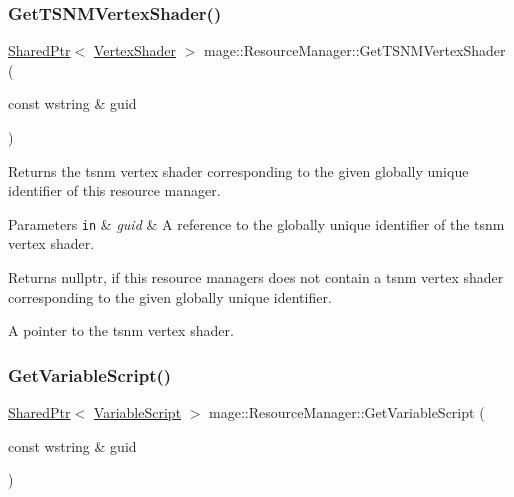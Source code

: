 \subsubsection{\texorpdfstring{Get\+T\+S\+N\+M\+Vertex\+Shader()}{GetTSNMVertexShader()}}
{\footnotesize\ttfamily \hyperlink{namespacemage_a1e01ae66713838a7a67d30e44c67703e}{Shared\+Ptr}$<$ \hyperlink{classmage_1_1_vertex_shader}{Vertex\+Shader} $>$ mage\+::\+Resource\+Manager\+::\+Get\+T\+S\+N\+M\+Vertex\+Shader (\begin{DoxyParamCaption}\item[{const wstring \&}]{guid }\end{DoxyParamCaption})\hspace{0.3cm}{\ttfamily [noexcept]}}

Returns the tsnm vertex shader corresponding to the given globally unique identifier of this resource manager.


\begin{DoxyParams}[1]{Parameters}
\mbox{\tt in}  & {\em guid} & A reference to the globally unique identifier of the tsnm vertex shader. \\
\hline
\end{DoxyParams}
\begin{DoxyReturn}{Returns}
{\ttfamily nullptr}, if this resource managers does not contain a tsnm vertex shader corresponding to the given globally unique identifier. 

A pointer to the tsnm vertex shader. 
\end{DoxyReturn}
\hypertarget{classmage_1_1_resource_manager_ac54eb6fd61322a66bdc704a88eca192d}{}\label{classmage_1_1_resource_manager_ac54eb6fd61322a66bdc704a88eca192d} 
\subsubsection{\texorpdfstring{Get\+Variable\+Script()}{GetVariableScript()}}
{\footnotesize\ttfamily \hyperlink{namespacemage_a1e01ae66713838a7a67d30e44c67703e}{Shared\+Ptr}$<$ \hyperlink{classmage_1_1_variable_script}{Variable\+Script} $>$ mage\+::\+Resource\+Manager\+::\+Get\+Variable\+Script (\begin{DoxyParamCaption}\item[{const wstring \&}]{guid }\end{DoxyParamCaption})\hspace{0.3cm}{\ttfamily [noexcept]}}


